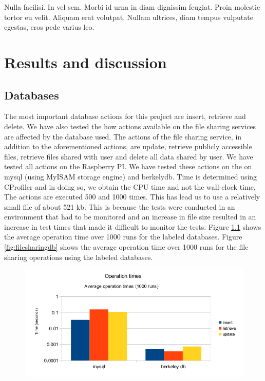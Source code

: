 \begin{savequote}[75mm] 
Nulla facilisi. In vel sem. Morbi id urna in diam dignissim feugiat. Proin molestie tortor eu velit. Aliquam erat volutpat. Nullam ultrices, diam tempus vulputate egestas, eros pede varius leo.
\end{savequote}

\chapter{Results and discussion}
\label{chaptersix}

\section{Databases}

The most important database actions for this project are insert, retrieve and delete. We have also tested the how actions available on the file sharing services are affected by the database used. The actions of the file sharing service, in addition to the aforementioned actions, are update, retrieve publicly accessible files, retrieve files shared with user and delete all data shared by user. We have tested all actions on the Raspberry PI. We have tested these actions on the on mysql (using MyISAM storage engine) and berkelydb. Time is determined using CProfiler and in doing so, we obtain the CPU time and not the wall-clock time. The actions are executed 500 and 1000 times. This has lead us to use a relatively small file of about 521 kb. This is because the tests were conducted in an environment that had to be monitored and an increase in file size resulted in an increase in test times that made it difficult to monitor the tests. Figure \ref{fig:genericdb} shows the average operation time over 1000 runs for the labeled databases. Figure \ref{fig:filesharingdb} shows the average operation time over 1000 runs for the file sharing operations using the labeled databases.

\begin{figure}
\centering
\includegraphics[scale=0.7]{figures/cprofilerdb}
\caption{}
\label{fig:genericdb}
\end{figure}

